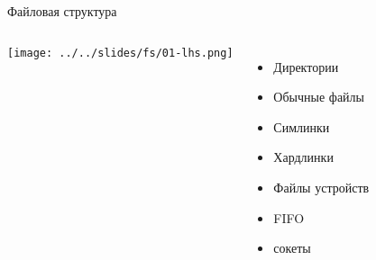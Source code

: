\begin{frame}{Файловая структура}
	
		
	\begin{columns}
		\texttt{[image: ../../slides/fs/01-lhs.png]}
		
		\begin{itemize}
			\item Директории
			\item Обычные файлы
			\item Симлинки
			\item Хардлинки
			\item Файлы устройств
			\item FIFO
			\item сокеты
		\end{itemize}
	\end{columns}
\end{frame}
